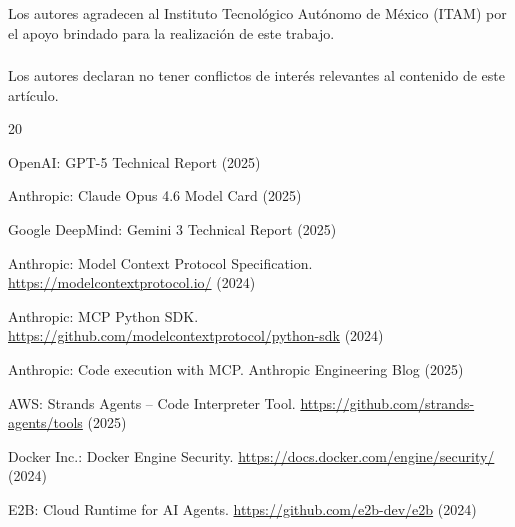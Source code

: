 \documentclass[runningheads]{llncs}
\begin{document}

%
\begin{credits}
\subsubsection{\ackname}
Los autores agradecen al Instituto Tecnol\'ogico Aut\'onomo de M\'exico (ITAM)
por el apoyo brindado para la realizaci\'on de este trabajo.

\subsubsection{\discintname}
Los autores declaran no tener conflictos de inter\'es relevantes al contenido
de este art\'iculo.
\end{credits}
%

%
\begin{thebibliography}{20}

OpenAI: GPT-5 Technical Report (2025)

Anthropic: Claude Opus 4.6 Model Card (2025)

Google DeepMind: Gemini 3 Technical Report (2025)

Anthropic: Model Context Protocol Specification.
\url{https://modelcontextprotocol.io/} (2024)

Anthropic: MCP Python SDK.
\url{https://github.com/modelcontextprotocol/python-sdk} (2024)

Anthropic: Code execution with MCP. Anthropic Engineering Blog (2025)

AWS: Strands Agents -- Code Interpreter Tool.
\url{https://github.com/strands-agents/tools} (2025)

Docker Inc.: Docker Engine Security.
\url{https://docs.docker.com/engine/security/} (2024)

E2B: Cloud Runtime for AI Agents.
\url{https://github.com/e2b-dev/e2b} (2024)


\end{thebibliography}
%
\end{document}
